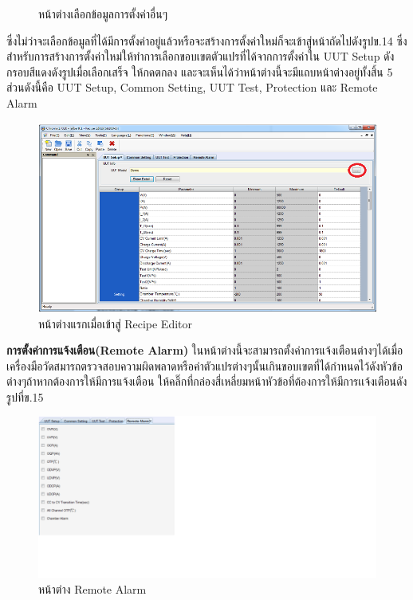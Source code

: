 \begin{center}
\begin{figure}[H]
		\centering
		\captionsetup{justification=centering,margin=2cm}
		\caption{หน้าต่างเลือกข้อมูลการตั้งค่าอื่นๆ}
	\end{figure}
\end{center}
ซึ่งไม่ว่าจะเลือกข้อมูลที่ได้มีการตั้งค่าอยู่แล้วหรือจะสร้างการตั้งค่าใหม่ก็จะเข้าสู่หน้าถัดไปดังรูปข.14 ซึ่งสำหรับการสร้างการตั้งค่าใหม่ให้ทำการเลือกขอบเขตตัวแปรที่ได้จากการตั้งค่าใน UUT Setup ดังกรอบสีแดงดังรูปเมื่อเลือกเสร็จ
ให้กดตกลง และจะเห็นได้ว่าหน้าต่างนี้จะมีแถบหน้าต่างอยู่ทั้งสิ้น 5 ส่วนดังนี้คือ UUT Setup, Common Setting, UUT Test, Protection และ Remote Alarm
\begin{center}
	\begin{figure}[H]
		\includegraphics[width=1\linewidth]{Chapters/img/17020_Program/Recipe_Editor/Setting_param_UUT_recipe_editor.png}
		\centering
		\captionsetup{justification=centering,margin=2cm}
		\caption{หน้าต่างแรกเมื่อเข้าสู่ Recipe Editor}
	\end{figure}
\end{center}
\textbf{การตั้งค่าการแจ้งเตือน(Remote Alarm)}
\newline \hspace*{2cm}
ในหน้าต่างนี้จะสามารถตั้งค่าการแจ้งเตือนต่างๆได้เมื่อเครื่องมือวัดสมารถตรวจสอบความผิดพลาดหรือค่าตัวแปรต่างๆนั้นเกินขอบเขตที่ได้กำหนดไว้ดังหัวข้อต่างๆถ้าหากต้องการให้มีการแจ้งเตือน
ให้คลิ๊กที่กล่องสี่เหลี่ยมหน้าหัวข้อที่ต้องการให้มีการเเจ้งเตือนดังรูปที่ข.15
\begin{center}
	\begin{figure}[H]
		\includegraphics[width=1\linewidth]{Chapters/img/17020_Program/Recipe_Editor/setting_remote_alarm.png}
		\centering
		\captionsetup{justification=centering,margin=2cm}
		\caption{หน้าต่าง Remote Alarm}
	\end{figure}
\end{center}
